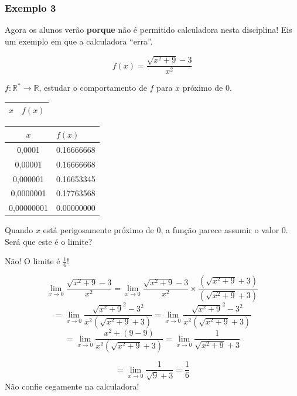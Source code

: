 \documentclass[a4paper]{article}
\begin{document}
\subsubsection{Exemplo 3}

Agora os alunos verão {\bf porque} não é permitido calculadora nesta disciplina! Eis um exemplo em que a calculadora ``erra''.


\begin{displaymath}
  f(x) = \frac{\sqrt{x^2+9} -3}{x^2}
\end{displaymath}

$f:\mathbb{R}^* \rightarrow \mathbb{R}$, estudar o comportamento de $f$ para $x$ próximo de 0.

   
\begin{multicols}{2}
  \begin{tabular}[h]{c|l}
$x$ & $f(x)$\\
\hline
  \end{tabular}

  \begin{tabular}[h]{c|l}
$x$ & $f(x)$\\
\hline
0,0001 & 0.16666668\\
\hline
0,00001 & 0.16666668\\
\hline
0,000001 & 0.16653345\\
\hline
0,0000001 & 0.17763568\\
\hline
0,00000001 & 0.00000000\\
  \end{tabular}
\end{multicols}

Quando $x$ está perigosamente próximo de 0, a função parece assumir o valor 0. Será que este é o limite?

Não! O limite é $\frac{1}{6}$!

\begin{displaymath}
  \lim_{x \rightarrow 0} \frac{\sqrt{x^2+9} -3}{x^2} =   \lim_{x \rightarrow 0}\frac{\sqrt{x^2+9} -3}{x^2} \times\frac{(\sqrt{x^2+9} +3)}{(\sqrt{x^2+9} +3)}
\end{displaymath}
\begin{displaymath}
 = \lim_{x \rightarrow 0} \frac{\sqrt{x^2+9}^2 - 3^2}{x^2(\sqrt{x^2+9}+3)}
= \lim_{x \rightarrow 0} \frac{\sqrt{x^2+9}^2 - 3^2}{x^2(\sqrt{x^2+9}+3)}
\end{displaymath}
\begin{displaymath}
  =\lim_{x \rightarrow 0} \frac{x^2+(9 - 9)}{x^2(\sqrt{x^2+9}+3)} = \lim_{x \rightarrow 0} \frac{1}{\sqrt{x^2+9}+3}
\end{displaymath}

\begin{displaymath}
 = \lim_{x \rightarrow 0} \frac{1}{\sqrt{9}+3} = \frac{1}{6}
\end{displaymath}
Não confie cegamente na calculadora!
\end{document}
